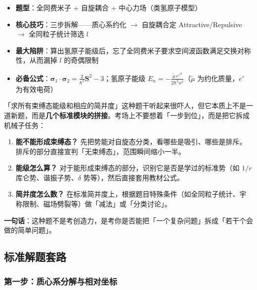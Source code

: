 \begin{insightbox}[核心考点]
\begin{itemize}[nosep]
    \item \textbf{题型}：全同费米子 + 自旋耦合 + 中心力场（类氢原子模型）
    \item \textbf{核心技巧}：三步拆解——质心系约化 $\to$ 自旋耦合定 Attractive/Repulsive $\to$ 全同粒子统计筛选 $l$
    \item \textbf{最大陷阱}：算出氢原子能级后，忘了全同费米子要求空间波函数满足交换对称性，从而漏掉 $l$ 的奇偶限制
    \item \textbf{必备公式}：$\bm{\sigma}_1 \cdot \bm{\sigma}_2 = \frac{2}{\hbar^2}\bm{S}^2 - 3$；氢原子能级 $E_n = -\frac{\tilde{\mu} \, e'^4}{2\hbar^2 n^2}$（$\tilde{\mu}$ 为约化质量，$e'$ 为有效电荷）
\end{itemize}
\end{insightbox}

\begin{tipbox}
「求所有束缚态能级和相应的简并度」这种题干听起来很吓人，但它本质上不是一道新题，而是\textbf{几个标准模块的拼接}。考场上不要想着「一步到位」，而是把它拆成机械子任务：
\begin{enumerate}[nosep]
    \item \textbf{能不能形成束缚态？} 先把势能对自旋态分类，看哪些是吸引、哪些是排斥。排斥的部分直接宣判「无束缚态」，范围瞬间缩小一半。
    \item \textbf{能级怎么算？} 对于能形成束缚态的部分，识别它是否是学过的标准势（如 $1/r$ 库仑势、谐振子势、$\delta$ 势等），然后直接套用教材公式。
    \item \textbf{简并度怎么数？} 在标准简并度上，根据题目特殊条件（如全同粒子统计、宇称限制、磁场劈裂等）做「减法」或「分类讨论」。
\end{enumerate}
\textbf{一句话}：这种题不是考创造力，是考你是否能把「一个复杂问题」拆成「若干个会做的简单问题」。
\end{tipbox}

\subsection{标准解题套路}

\subsubsection{第一步：质心系分解与相对坐标}

